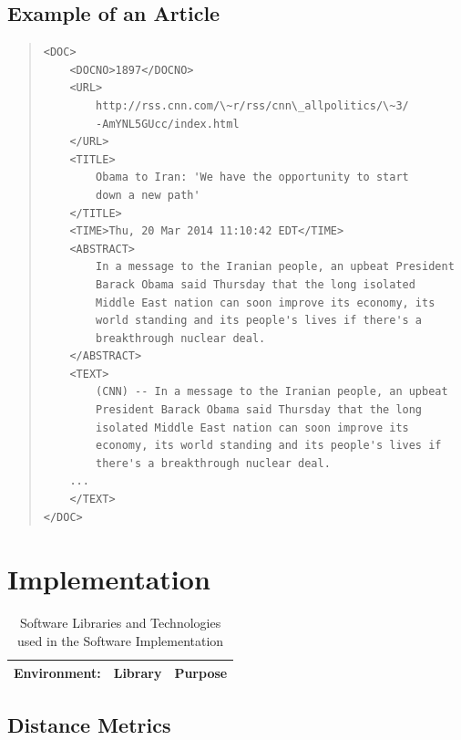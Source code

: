 \documentclass[11pt]{article}
\begin{document}
\pagebreak
\subsection{Example of an Article}

\small 
\begin{quote} \label{samplearticle}
\begin{verbatim}
<DOC>
    <DOCNO>1897</DOCNO>
    <URL>
        http://rss.cnn.com/\~r/rss/cnn\_allpolitics/\~3/
        -AmYNL5GUcc/index.html
    </URL>
    <TITLE>
        Obama to Iran: 'We have the opportunity to start
        down a new path'
    </TITLE>
    <TIME>Thu, 20 Mar 2014 11:10:42 EDT</TIME>
    <ABSTRACT>
        In a message to the Iranian people, an upbeat President
        Barack Obama said Thursday that the long isolated
        Middle East nation can soon improve its economy, its
        world standing and its people's lives if there's a
        breakthrough nuclear deal.
    </ABSTRACT>
    <TEXT>
        (CNN) -- In a message to the Iranian people, an upbeat
        President Barack Obama said Thursday that the long
        isolated Middle East nation can soon improve its
        economy, its world standing and its people's lives if
        there's a breakthrough nuclear deal.
    ...
    </TEXT>
</DOC>
\end{verbatim}
\end{quote}
\normalsize


\section{Implementation} \label{sec:software}

\begin{table}[h]
	\centering
	\begin{tabular}{ r c c  }
		\hline
		Environment: & Library & Purpose \\ \hline

	\end{tabular}
	
	\caption{Software Libraries and Technologies used in the Software Implementation}
	\label{table:categories}
\end{table}

\subsection{Distance Metrics}
\end{document}
